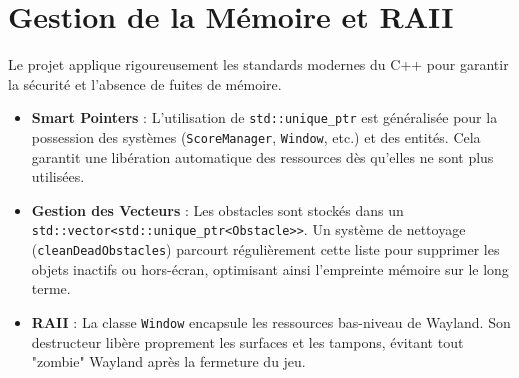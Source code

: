\section{Gestion de la Mémoire et RAII}

Le projet applique rigoureusement les standards modernes du C++ pour garantir la sécurité et l'absence de fuites de mémoire.

\begin{itemize}
    \item \textbf{Smart Pointers} : L'utilisation de \texttt{std::unique\_ptr} est généralisée pour la possession des systèmes (\texttt{ScoreManager}, \texttt{Window}, etc.) et des entités. Cela garantit une libération automatique des ressources dès qu'elles ne sont plus utilisées.
    \item \textbf{Gestion des Vecteurs} : Les obstacles sont stockés dans un \texttt{std::vector<std::unique\_ptr<Obstacle>>}. Un système de nettoyage (\texttt{cleanDeadObstacles}) parcourt régulièrement cette liste pour supprimer les objets inactifs ou hors-écran, optimisant ainsi l'empreinte mémoire sur le long terme.
    \item \textbf{RAII} : La classe \texttt{Window} encapsule les ressources bas-niveau de Wayland. Son destructeur libère proprement les surfaces et les tampons, évitant tout "zombie" Wayland après la fermeture du jeu.
\end{itemize}

